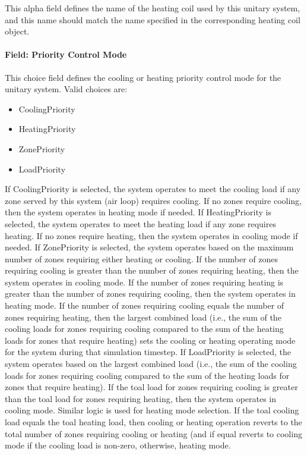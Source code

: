 This alpha field defines the name of the heating coil used by this unitary system, and this name should match the name specified in the corresponding heating coil object.

\paragraph{Field: Priority Control Mode}\label{field-priority-control-mode}

This choice field defines the cooling or heating priority control mode for the unitary system. Valid choices are:

\begin{itemize}
\item
  CoolingPriority
\item
  HeatingPriority
\item
  ZonePriority
\item
  LoadPriority
\end{itemize}

If CoolingPriority is selected, the system operates to meet the cooling load if any zone served by this system (air loop) requires cooling. If no zones require cooling, then the system operates in heating mode if needed. If HeatingPriority is selected, the system operates to meet the heating load if any zone requires heating. If no zones require heating, then the system operates in cooling mode if needed. If ZonePriority is selected, the system operates based on the maximum number of zones requiring either heating or cooling. If the number of zones requiring cooling is greater than the number of zones requiring heating, then the system operates in cooling mode. If the number of zones requiring heating is greater than the number of zones requiring cooling, then the system operates in heating mode. If the number of zones requiring cooling equals the number of zones requiring heating, then the largest combined load (i.e., the sum of the cooling loads for zones requiring cooling compared to the sum of the heating loads for zones that require heating) sets the cooling or heating operating mode for the system during that simulation timestep. If LoadPriority is selected, the system operates based on the largest combined load (i.e., the sum of the cooling loads for zones requiring cooling compared to the sum of the heating loads for zones that require heating). If the toal load for zones requiring cooling is greater than the toal load for zones requiring heating, then the system operates in cooling mode. Similar logic is used for heating mode selection. If the toal cooling load equals the toal heating load, then cooling or heating operation reverts to the total number of zones requiring cooling or heating (and if equal reverts to cooling mode if the cooling load is non-zero, otherwise, heating mode.

